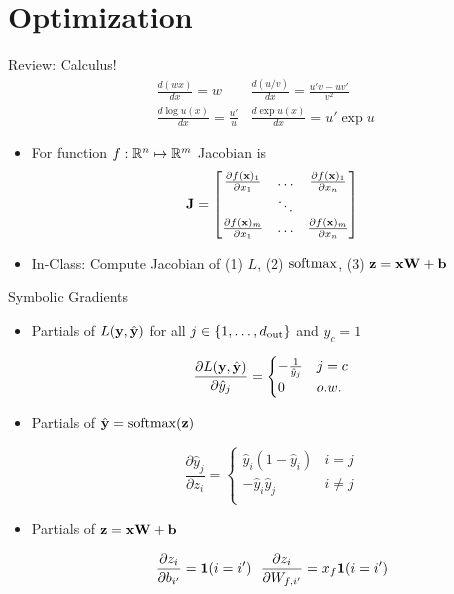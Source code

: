 \documentclass{beamer}
\begin{document}
\section{Optimization}
\begin{frame}{Review: Calculus!}
  \begin{align*}
    &\frac{d (w x)  }{d x} = w   & \frac{d (u/v) }{d x} = \frac{u'v -   uv'} {v^2}  \\
   &\frac{d \log u(x) }{d x} = \frac{u'}{u}  & \frac{d \exp u(x) }{d x} =  u' \exp u
  \end{align*}

  \begin{itemize}
  \item For function $f: \mathbb{R}^n \mapsto \mathbb{R}^m $ Jacobian is
    \[ \mathbf{J} = \begin{bmatrix} \frac{\partial f(\mathbf{x})_1}{\partial x_1} & \ldots&  \frac{\partial f(\mathbf{x})_1}{\partial x_n} \\
      &\ddots& \\
      \frac{\partial f(\mathbf{x})_m}{\partial x_1} & \ldots &  \frac{\partial f(\mathbf{x})_m}{\partial x_n} \\
    \end{bmatrix}\]

     \item In-Class: Compute Jacobian of (1) $L$,  (2) $\softmax$, (3) $\mathbf{z} = \mathbf{x} \mathbf{W} + \mathbf{b}$
  \end{itemize}


\end{frame}


\begin{frame}{Symbolic Gradients}

  \begin{itemize}
  \item

  Partials of $L(\mathbf{y}, \hat{\mathbf{y}})$ for all $j \in \{1, \ldots, {d_{\mathrm{out}}}\}$ and $y_c = 1$

  \[ \frac{\partial L(\mathbf{y}, \hat{\mathbf{y}})}{\partial \hat{y}_j} = \begin{cases}-\frac{1} {\hat{y}_j} & j = c\\ 0 & o.w. \end{cases}  \]
  \pause

  \item
    Partials of $\hat{\boldy} = \softmax(\boldz)$

  \[ \frac{\partial \hat{y}_j }{\partial z_i} =
    \begin{cases}
      \hat{y}_i (1 - \hat{y}_i) & i = j\\
      - \hat{y}_i \hat{y}_j & i \neq j \\
    \end{cases} \]

  \pause
  \item Partials of $\mathbf{z}  = \mathbf{x} \mathbf{W} + \mathbf{b} $

  \[ \frac{\partial z_i }{\partial b_{i'}} = \mathbf{1}(i = i') \ \  \frac{\partial z_i }{\partial W_{f, i'}} = x_f \mathbf{1}(i = i') \]

  \end{itemize}

\end{frame}
\end{document}
